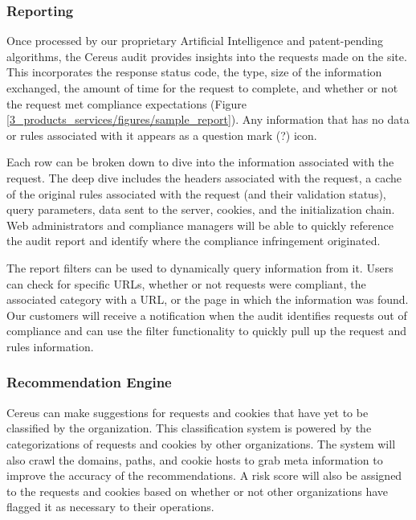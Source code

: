 \subsubsection{Reporting}

Once processed by our proprietary Artificial Intelligence and patent-pending algorithms, the Cereus audit provides insights into the requests made on the site. This incorporates the response status code, the type, size of the information exchanged, the amount of time for the request to complete, and whether or not the request met compliance expectations (Figure \ref{3_products_services/figures/sample_report}). Any information that has no data or rules associated with it appears as a question mark (?) icon.

Each row can be broken down to dive into the information associated with the request. The deep dive includes the headers associated with the request, a cache of the original rules associated with the request (and their validation status), query parameters, data sent to the server, cookies, and the initialization chain. Web administrators and compliance managers will be able to quickly reference the audit report and identify where the compliance infringement originated.


The report filters can be used to dynamically query information from it. Users can check for specific URLs, whether or not requests were compliant, the associated category with a URL, or the page in which the information was found. Our customers will receive a notification when the audit identifies requests out of compliance and can use the filter functionality to quickly pull up the request and rules information. 

\subsubsection{Recommendation Engine}

Cereus can make suggestions for requests and cookies that have yet to be classified by the organization. This classification system is powered by the categorizations of requests and cookies by other organizations. The system will also crawl the domains, paths, and cookie hosts to grab meta information to improve the accuracy of the recommendations. A risk score will also be assigned to the requests and cookies based on whether or not other organizations have flagged it as necessary to their operations.

